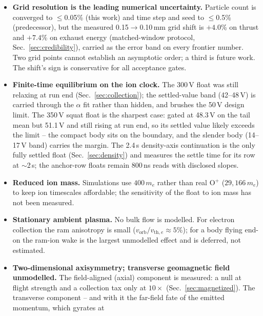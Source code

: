 \documentclass[11pt]{article}
\begin{document}
\begin{itemize}
        follow-on measurement, and the cheapest, since lower-$\chi$
        equilibria settle faster than the runs already reported.
  \item \textbf{Grid resolution is the leading numerical uncertainty.}
        Particle count is converged to $\le$0.05\% (this work) and time
        step and seed to $\le$0.5\% (predecessor), but the measured
        0.15$\to$0.10\,mm grid shift is $+4.0$\% on thrust and $+7.4$\% on
        exhaust energy (matched-window protocol,
        Sec.~\ref{sec:credibility}), carried as the error band on every
        frontier number. Two grid points cannot establish an asymptotic
        order; a third is future work. The shift's sign is conservative
        for all acceptance gates.
  \item \textbf{Finite-time equilibrium on the ion clock.} The 300\,V float
        was still relaxing at run end (Sec.~\ref{sec:collection}); the
        settled-value band (42--48\,V) is carried through the $\alpha$ fit
        rather than hidden, and brushes the 50\,V design limit. The
        350\,V squat float is the sharpest case: gated at 48.3\,V on the
        tail mean but 51.1\,V and still rising at run end, so its settled
        value likely exceeds the limit -- the compact body sits on the
        boundary, and the slender body (14--17\,V band) carries the
        margin. The
        2.4\,\textmu s density-axis continuation is the only fully settled
        float (Sec.~\ref{sec:density}) and measures the settle time for
        its row at $\sim$2\,\textmu s; the anchor-row floats remain
        800\,ns reads with disclosed slopes.
  \item \textbf{Reduced ion mass.} Simulations use $400\,m_e$ rather than
        real O$^+$ ($29{,}166\,m_e$) to keep ion timescales affordable; the
        sensitivity of the float to ion mass has not been measured.
  \item \textbf{Stationary ambient plasma.} No bulk flow is modelled. For
        electron collection the ram anisotropy is small
        ($v_{\mathrm{orb}}/v_{\mathrm{th},e} \approx 5\%$); for a body
        flying end-on the ram-ion wake is the largest unmodelled effect and
        is deferred, not estimated.
  \item \textbf{Two-dimensional axisymmetry; transverse geomagnetic field
        unmodelled.} The field-aligned (axial) component is measured: a
        null at flight strength and a collection tax only at $10\times$
        (Sec.~\ref{sec:magnetized}). The transverse component -- and with
        it the far-field fate of the emitted momentum, which gyrates at

\end{itemize}
\end{document}
